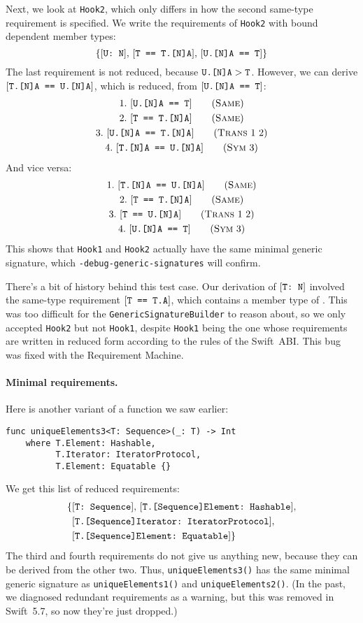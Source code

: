 \documentclass[../generics]{subfiles}
\begin{document}
Next, we look at \texttt{Hook2}, which only differs in how the second same-type requirement is specified. We write the requirements of \texttt{Hook2} with bound dependent member types:
\[\{[\texttt{U:~N}],\,[\texttt{T == T.[N]A}],\,[\texttt{U.[N]A == T}]\}\]
The last requirement is not reduced, because $\texttt{U.[N]A}>\texttt{T}$. However, we can derive $[\texttt{T.[N]A == U.[N]A}]$, which is reduced, from $[\texttt{U.[N]A == T}]$:
\begin{gather*}
\SameStep{U.[N]A}{T}{1}\\
\SameStep{T}{T.[N]A}{2}\\
\TransStep{1}{2}{U.[N]A}{T.[N]A}{3}\\
\SymStep{3}{T.[N]A}{U.[N]A}{4}
\end{gather*}
And vice versa:
\begin{gather*}
\SameStep{T.[N]A}{U.[N]A}{1}\\
\SameStep{T}{T.[N]A}{2}\\
\TransStep{1}{2}{T}{U.[N]A}{3}\\
\SymStep{3}{U.[N]A}{T}{4}
\end{gather*}
This shows that \texttt{Hook1} and \texttt{Hook2} actually have the same minimal generic signature, which \texttt{-debug-generic-signatures} will confirm.

There's a bit of history behind this test case. Our derivation of $[\texttt{T:~N}]$ involved the same-type requirement $[\texttt{T == T.A}]$, which contains a member type of \tT. This was too difficult for the \texttt{GenericSignatureBuilder} to reason about, so we only accepted \texttt{Hook2} but not \texttt{Hook1}, despite \texttt{Hook1} being the one whose requirements are written in reduced form according to the rules of the Swift~ABI. This bug was fixed with the Requirement Machine.

\paragraph{Minimal requirements.} Here is another variant of a function we saw earlier:
\begin{Verbatim}
func uniqueElements3<T: Sequence>(_: T) -> Int
    where T.Element: Hashable,
          T.Iterator: IteratorProtocol,
          T.Element: Equatable {}
\end{Verbatim}
We get this list of reduced requirements:
\begin{align*}
\{&[\texttt{T:~Sequence}],\,[\texttt{T.[Sequence]Element:~Hashable}],\\
&[\texttt{T.[Sequence]Iterator:~IteratorProtocol}],\\
&[\texttt{T.[Sequence]Element:~Equatable}]\}
\end{align*}
The third and fourth requirements do not give us anything new, because they can be derived from the other two. Thus, \texttt{uniqueElements3()} has the same minimal generic signature as \texttt{uniqueElements1()} and \texttt{uniqueElements2()}. (In the past, we diagnosed redundant requirements as a warning, but this was removed in Swift~5.7, so now they're just dropped.)
\end{document}
